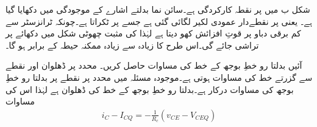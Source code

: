 شکل  ب میں  پر  نقطہ کارکردگی ہے۔سائن نما بدلتے اشارے کے موجودگی میں  دکھایا گیا ہے۔ یعنی  پر نقطےدار عمودی لکیر لگائی گئی ہے جسے    پر ٹکراتا ہے۔چونکہ ٹرانزسٹر  سے کم برقی دباو پر قوتِ افزائش کھو دیتا ہے لہٰذا  کی مثبت چھوٹی شکل میں دکھائے  پر تراشی جائے گی۔اس طرح  کا زیادہ سے زیادہ ممکنہ حیطہ  کے برابر ہو گا۔

آئیں بدلتا رو خطِ بوجھ کے خط کی مساوات حاصل کریں۔ محدد پر  ڈھلوان اور نقطے سے گزرتے خط کی مساوات  ہوتی ہے۔موجودہ مسئلہ میں  محدد پر نقطے پر بدلتا رو خطِ بوجھ کی مساوات درکار ہے۔بدلتا رو خطِ بوجھ کے خط کی ڈھلوان  ہے لہٰذا اس کی مساوات
\begin{align}\label{مساوات_ٹرانزسٹر_بدلتا_بار_خط_مساوات}
i_C-I_{CQ}=-\frac{1}{R_c} \left(v_{CE}-V_{CEQ} \right)
\end{align} 

